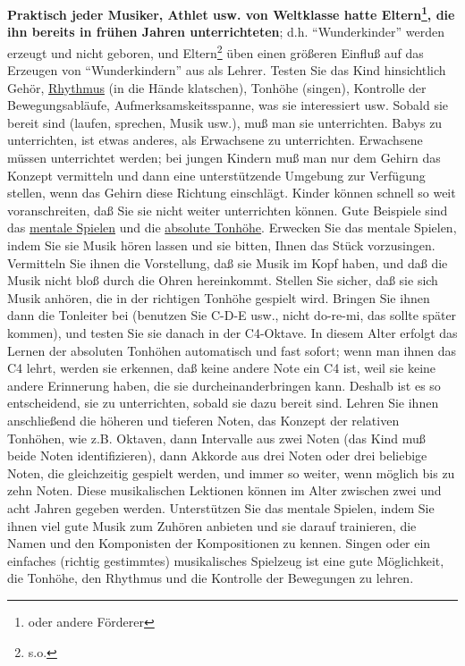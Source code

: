 \textbf{Praktisch jeder Musiker, Athlet usw. von Weltklasse hatte Eltern\footnote{oder andere Förderer}, die ihn bereits in frühen Jahren unterrichteten}; d.h. \enquote{Wunderkinder} werden erzeugt und nicht geboren, und Eltern\footnote{s.o.} üben einen größeren Einfluß auf das Erzeugen von \enquote{Wunderkindern} aus als Lehrer.
Testen Sie das Kind hinsichtlich Gehör, \hyperref[c1iii1b]{Rhythmus} (in die Hände klatschen), Tonhöhe (singen), Kontrolle der Bewegungsabläufe, Aufmerksamskeitsspanne, was sie interessiert usw.
Sobald sie bereit sind (laufen, sprechen, Musik usw.), muß man sie unterrichten.
Babys zu unterrichten, ist etwas anderes, als Erwachsene zu unterrichten.
Erwachsene müssen unterrichtet werden; bei jungen Kindern muß man nur dem Gehirn das Konzept vermitteln und dann eine unterstützende Umgebung zur Verfügung stellen, wenn das Gehirn diese Richtung einschlägt.
Kinder können schnell so weit voranschreiten, daß Sie sie nicht weiter unterrichten können.
Gute Beispiele sind das \hyperref[c1ii12mental]{mentale Spielen} und die \hyperref[c1iii12]{absolute Tonhöhe}.
Erwecken Sie das mentale Spielen, indem Sie sie Musik hören lassen und sie bitten, Ihnen das Stück vorzusingen.
Vermitteln Sie ihnen die Vorstellung, daß sie Musik im Kopf haben, und daß die Musik nicht bloß durch die Ohren hereinkommt.
Stellen Sie sicher, daß sie sich Musik anhören, die in der richtigen Tonhöhe gespielt wird.
Bringen Sie ihnen dann die Tonleiter bei (benutzen Sie C-D-E usw., nicht do-re-mi, das sollte später kommen), und testen Sie sie danach in der C4-Oktave.
In diesem Alter erfolgt das Lernen der absoluten Tonhöhen automatisch und fast sofort; wenn man ihnen das C4 lehrt, werden sie erkennen, daß keine andere Note ein C4 ist, weil sie keine andere Erinnerung haben, die sie durcheinanderbringen kann.
Deshalb ist es so entscheidend, sie zu unterrichten, sobald sie dazu bereit sind.
Lehren Sie ihnen anschließend die höheren und tieferen Noten, das Konzept der relativen Tonhöhen, wie z.B. Oktaven, dann Intervalle aus zwei Noten (das Kind muß beide Noten identifizieren), dann Akkorde aus drei Noten oder drei beliebige Noten, die gleichzeitig gespielt werden, und immer so weiter, wenn möglich bis zu zehn Noten.
Diese musikalischen Lektionen können im Alter zwischen zwei und acht Jahren gegeben werden.
Unterstützen Sie das mentale Spielen, indem Sie ihnen viel gute Musik zum Zuhören anbieten und sie darauf trainieren, die Namen und den Komponisten der Kompositionen zu kennen.
Singen oder ein einfaches (richtig gestimmtes) musikalisches Spielzeug ist eine gute Möglichkeit, die Tonhöhe, den Rhythmus und die Kontrolle der Bewegungen zu lehren.
